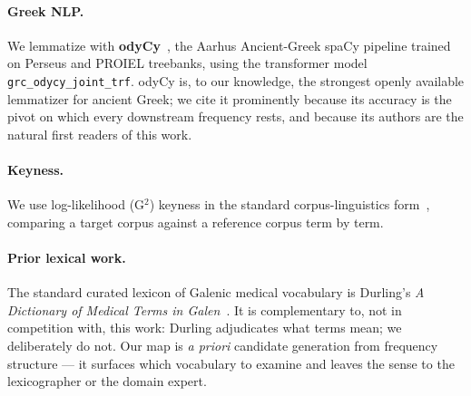 \documentclass[11pt]{article}
\begin{document}
\paragraph{Greek NLP.}
We lemmatize with \textbf{odyCy}~\citep{kostkan-etal-2023-odycy}, the Aarhus Ancient-Greek
spaCy pipeline trained on Perseus and PROIEL treebanks, using the transformer model
\texttt{grc\_odycy\_joint\_trf}. odyCy is, to our knowledge, the strongest openly available lemmatizer for
ancient Greek; we cite it prominently because its accuracy is the pivot on which every downstream
frequency rests, and because its authors are the natural first readers of this work.

\paragraph{Keyness.}
We use log-likelihood (G$^2$) keyness in the standard corpus-linguistics form~\citep{dunning-1993-accurate,rayson-garside-2000-comparing},
comparing a target corpus against a reference corpus term by term.

\paragraph{Prior lexical work.}
The standard curated lexicon of Galenic medical vocabulary is Durling's \textit{A Dictionary of
Medical Terms in Galen}~\citep{durling-1993}. It is complementary to, not in competition with, this
work: Durling adjudicates what terms mean; we deliberately do not. Our map is \textit{a priori}
candidate generation from frequency structure --- it surfaces which vocabulary to examine and leaves
the sense to the lexicographer or the domain expert.
\end{document}
